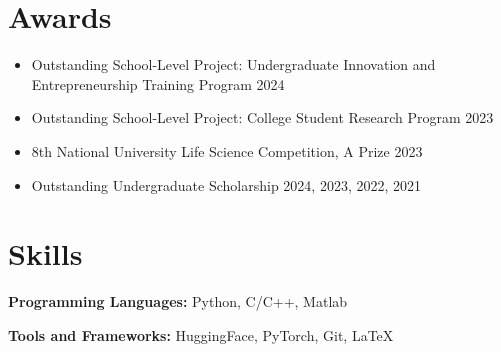\documentclass{resume}
\begin{document}
\section{Awards}
\begin{itemize}
  \item Outstanding School-Level Project: Undergraduate Innovation and Entrepreneurship Training Program \hfill 2024
  \item Outstanding School-Level Project: College Student Research Program \hfill 2023
  \item 8th National University Life Science Competition, A Prize \hfill 2023
  \item Outstanding Undergraduate Scholarship \hfill 2024, 2023, 2022, 2021
\end{itemize}


\section{Skills}
\textbf{Programming Languages:} Python, C/C++, Matlab

\textbf{Tools and Frameworks:} HuggingFace, PyTorch, Git, \LaTeX
\end{document}

